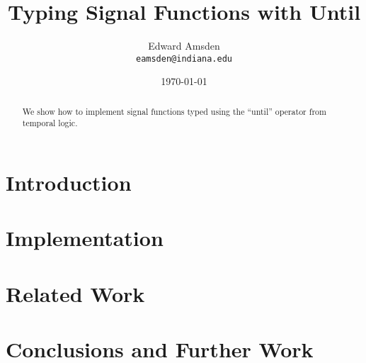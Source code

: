 \documentclass{article}
\title{Typing Signal Functions with Until}
\author{Edward Amsden\\{\tt eamsden@indiana.edu}}
\date{\today}
\begin{document}
\maketitle

\begin{abstract}

We show how to implement signal functions typed using the ``until''
operator from temporal logic.

\end{abstract}

\section{Introduction}
\label{section:Introduction}

\section{Implementation}
\label{section:Implementation}

\section{Related Work}
\label{section:Related_Work}

\section{Conclusions and Further Work}
\label{section:Conclusions_and_Further_Work}
\end{document}
